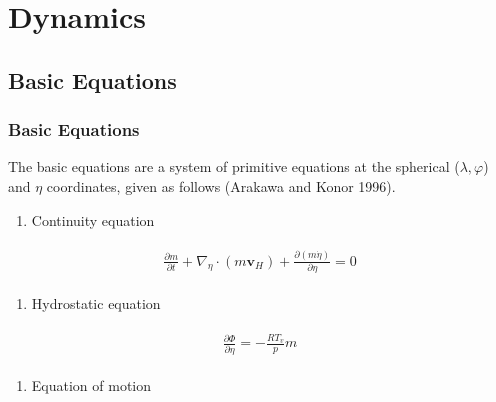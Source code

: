 \hypertarget{dynamics}{%
\section{Dynamics}\label{dynamics}}

\hypertarget{basic-equations}{%
\subsection{Basic Equations}\label{basic-equations}}

\hypertarget{basic-equations-1}{%
\subsubsection{Basic Equations}\label{basic-equations-1}}

The basic equations are a system of primitive equations at the spherical (\(\lambda,\varphi\)) and \(\eta\) coordinates, given as follows (Arakawa and Konor 1996).

\begin{enumerate}
\def\labelenumi{\arabic{enumi}.}
\tightlist
\item
  Continuity equation
\end{enumerate}

\begin{eqnarray}\begin{aligned}
  \frac{\partial m}{\partial t}
    + \nabla_{\eta} \cdot (m\mathbf{v}_H)+ \frac{\partial (m\dot{\eta})}{\partial \eta} = 0\end{aligned}\end{eqnarray}

\begin{enumerate}
\def\labelenumi{\arabic{enumi}.}
\tightlist
\item
  Hydrostatic equation
\end{enumerate}

\begin{eqnarray}\begin{aligned}
  \frac{\partial \Phi}{\partial \eta} = - \frac{RT_v}{p} m\end{aligned}\end{eqnarray}

\begin{enumerate}
\def\labelenumi{\arabic{enumi}.}
\tightlist
\item
  Equation of motion
\end{enumerate}

